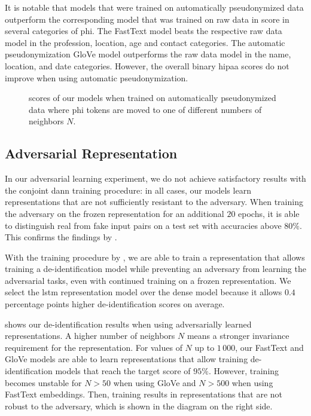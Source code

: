 %
It is notable that models that were trained on automatically pseudonymized data outperform the corresponding model that was trained on raw data in \fone score in several categories of \ac{phi}.
%
The FastText model beats the respective raw data model in the profession, location, age and contact categories.
%
The automatic pseudonymization GloVe model outperforms the raw data model in the name, location, and date categories.
%
However, the overall binary \ac{hipaa} \fone scores do not improve when using automatic pseudonymization.

\begin{figure}
    \centering
    
    \caption[De-identification with automatic pseudonymization]{\fone scores of our models when trained on automatically pseudonymized data where \ac{phi} tokens are moved to one of different numbers of neighbors $N$.}\label{fig:auto-pseudo}
\end{figure}

\subsection{Adversarial Representation}
%
In our adversarial learning experiment, we do not achieve satisfactory results with the conjoint \ac{dann} training procedure: in all cases, our models learn representations that are not sufficiently resistant to the adversary.
%
When training the adversary on the frozen representation for an additional $20$ epochs, it is able to distinguish real from fake input pairs on a test set with accuracies above $80\%$.
%
This confirms the findings by \citet{elazar2018adversarial}.

%
With the training procedure by \citet{feutry2018learning}, we are able to train a representation that allows training a de-identification model while preventing an adversary from learning the adversarial tasks, even with continued training on a frozen representation.
%
We select the \ac{lstm} representation model over the dense model because it allows $0.4$ percentage points higher de-identification \fone scores on average.

%
 shows our de-identification results when using adversarially learned representations.
%
A higher number of neighbors $N$ means a stronger invariance requirement for the representation.
%
For values of $N$ up to $1\,000$, our FastText and GloVe models are able to learn representations that allow training de-identification models that reach the target \fone score of $95\%$.
%
However, training becomes unstable for $N>50$ when using GloVe and $N>500$ when using FastText embeddings.
%
Then, training results in representations that are not robust to the adversary, which is shown in the diagram on the right side.

